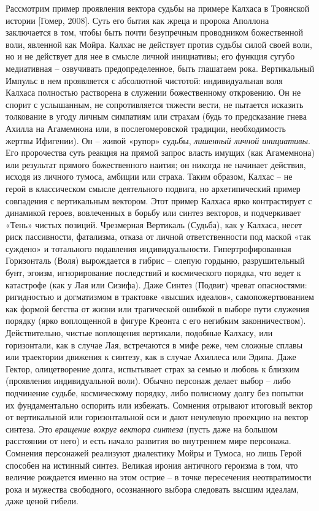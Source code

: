     Рассмотрим пример проявления вектора судьбы на примере Калхаса в Троянской истории [Гомер, 2008]. Суть его бытия как жреца и пророка Аполлона заключается в том, чтобы быть почти безупречным проводником божественной воли, явленной как Мойра. Калхас не действует против судьбы силой своей воли, но и не действует для нее в смысле личной инициативы; его функция сугубо медиативная – озвучивать предопределенное, быть глашатаем рока. Вертикальный Импульс в нем проявляется с абсолютной чистотой: индивидуальная воля Калхаса полностью растворена в служении божественному откровению. Он не спорит с услышанным, не сопротивляется тяжести вести, не пытается исказить толкование в угоду личным симпатиям или страхам (будь то предсказание гнева Ахилла на Агамемнона или, в послегомеровской традиции, необходимость жертвы Ифигении). Он – живой «рупор» судьбы, \textit{лишенный личной инициативы}. Его пророчества суть реакция на прямой запрос власть имущих (как Агамемнона) или результат прямого божественного наития; он никогда не начинает действия, исходя из личного тумоса, амбиции или страха. Таким образом, Калхас – не герой в классическом смысле деятельного подвига, но архетипический пример совпадения с вертикальным вектором.
    Этот пример Калхаса ярко контрастирует с динамикой героев, вовлеченных в борьбу или синтез векторов, и подчеркивает «Тень» чистых позиций. Чрезмерная Вертикаль (Судьба), как у Калхаса, несет риск пассивности, фатализма, отказа от личной ответственности под маской «так суждено» и тотального подавления индивидуальности. Гипертрофированная Горизонталь (Воля) вырождается в гибрис – слепую гордыню, разрушительный бунт, эгоизм, игнорирование последствий и космического порядка, что ведет к катастрофе (как у Лая или Сизифа). Даже Синтез (Подвиг) чреват опасностями: ригидностью и догматизмом в трактовке «высших идеалов», самопожертвованием как формой бегства от жизни или трагической ошибкой в выборе пути служения порядку (ярко воплощенной в фигуре Креонта с его негибким законничеством).
    Действительно, чистые воплощения вертикали, подобные Калхасу, или горизонтали, как в случае Лая, встречаются в мифе реже, чем сложные сплавы или траектории движения к синтезу, как в случае Ахиллеса или Эдипа. Даже Гектор, олицетворение долга, испытывает страх за семью и любовь к близким (проявления индивидуальной воли). Обычно персонаж делает выбор – либо подчинение судьбе, космическому порядку, либо полисному долгу без попытки их фундаментально оспорить или избежать. Сомнения отрывают итоговый вектор от вертикальной или горизонтальной оси и дают ненулевую проекцию на вектор синтеза. Это \textit{вращение вокруг вектора синтеза} (пусть даже на большом расстоянии от него) и есть начало развития во внутреннем мире персонажа. Сомнения персонажей реализуют диалектику Мойры и Тумоса, но лишь Герой способен на истинный синтез. Великая ирония античного героизма в том, что величие рождается именно на этом острие – в точке пересечения неотвратимости рока и мужества свободного, осознанного выбора следовать высшим идеалам, даже ценой гибели.

